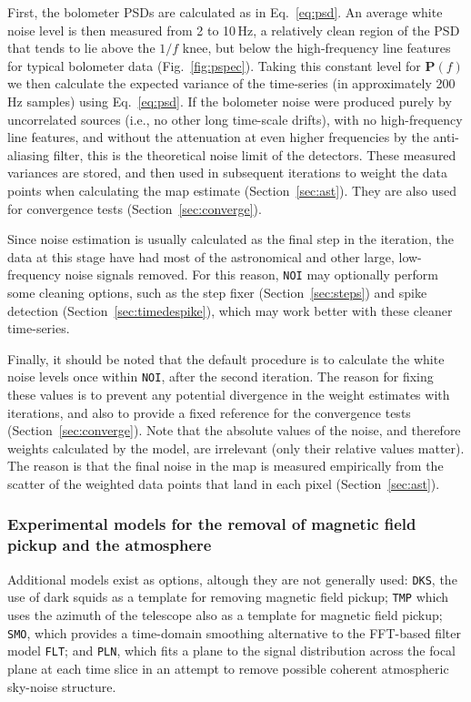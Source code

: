 \documentclass[useAMS,usenatbib,nofootinbib]{mn2e}
\newcommand{\model}[1]{\texttt{#1}}
\begin{document}
First, the bolometer PSDs are calculated as in Eq.~\ref{eq:psd}. An
average white noise level is then measured from 2 to 10\,Hz, a
relatively clean region of the PSD that tends to lie above the $1/f$
knee, but below the high-frequency line features for typical bolometer
data (Fig.~\ref{fig:pspec}). Taking this constant level for
$\mathbf{P}(f)$ we then calculate the expected variance of the
time-series (in approximately 200\,Hz samples) using
Eq.~\ref{eq:psd}. If the bolometer noise were produced purely by
uncorrelated sources (i.e., no other long time-scale drifts), with no
high-frequency line features, and without the attenuation at even
higher frequencies by the anti-aliasing filter, this is the
theoretical noise limit of the detectors. These measured variances are
stored, and then used in subsequent iterations to weight the data
points when calculating the map estimate (Section~\ref{sec:ast}). They
are also used for convergence tests (Section~\ref{sec:converge}).

Since noise estimation is usually calculated as the final step in the
iteration, the data at this stage have had most of the astronomical
and other large, low-frequency noise signals removed. For this reason,
\model{NOI} may optionally perform some cleaning options, such as the
step fixer (Section~\ref{sec:steps}) and spike detection
(Section~\ref{sec:timedespike}), which may work better with these
cleaner time-series.

Finally, it should be noted that the default procedure is to calculate
the white noise levels once within \model{NOI}, after the second
iteration. The reason for fixing these values is to prevent any
potential divergence in the weight estimates with iterations, and also
to provide a fixed reference for the convergence tests
(Section~\ref{sec:converge}). Note that the absolute values of the
noise, and therefore weights calculated by the model, are irrelevant
(only their relative values matter). The reason is that the final
noise in the map is measured empirically from the scatter of the
weighted data points that land in each pixel (Section~\ref{sec:ast}).

\subsubsection{Experimental models for the removal of magnetic field
  pickup and the atmosphere}
\label{sec:experimental}

Additional models exist as options, altough they are not generally
used: \model{DKS}, the use of dark squids as a template for removing
magnetic field pickup; \model{TMP} which uses the azimuth of the
telescope also as a template for magnetic field pickup; \model{SMO},
which provides a time-domain smoothing alternative to the FFT-based
filter model \model{FLT}; and \model{PLN}, which fits a plane to the
signal distribution across the focal plane at each time slice in an
attempt to remove possible coherent atmospheric sky-noise structure.
\end{document}
